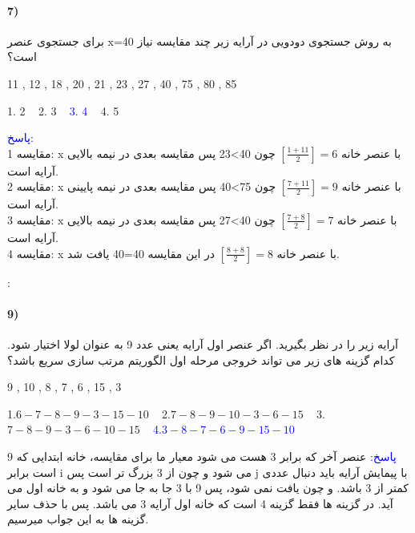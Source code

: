 \documentclass[10pt,a4paper]{article}
\begin{document}
	\paragraph{7)} برای جستجوی عنصر x=40 به روش جستجوی دودویی در آرایه زیر چند مقایسه نیاز است؟
	\begin{flushleft} 
		\begin{latin}
			11 , 12 , 18 , 20 , 21 , 23 , 27 , 40 , 75 , 80 , 85 
		\end{latin}
	\end{flushleft}
	\begin{flushright} 
		1. 2\,\,\,\,\, 2. 3\,\,\,\,\, \textcolor{blue}{3. 4}\,\,\,\,\, 4. 5
	\end{flushright}
	\begin{flushright} 
		\textcolor{blue}{پاسخ:}\\
		مقایسه 1: x با عنصر خانه $[\frac{1+11}{2}]=6$ چون 40>23 پس مقایسه بعدی در نیمه بالایی آرایه است. \\
		مقایسه 2: x با عنصر خانه $[\frac{7+11}{2}]=9$ چون 75>40 پس مقایسه بعدی در نیمه پایینی آرایه است. \\
		مقایسه 3: x با عنصر خانه $[\frac{7+8}{2}]=7$ چون 40>27 پس مقایسه بعدی در نیمه بالایی آرایه است. \\ 
		مقایسه 4: x با عنصر خانه $[\frac{8+8}{2}]=8$ در این مقایسه 40=40 یافت شد.
	\end{flushright}:

	\paragraph{9)} آرایه زیر را در نظر بگیرید. اگر عنصر اول آرایه یعنی عدد 9 به عنوان لولا اختیار شود. کدام گزینه های زیر می تواند خروجی مرحله اول الگوریتم مرتب سازی سریع باشد؟
	\begin{flushleft} 
		\begin{latin}
			9 , 10 , 8 , 7 , 6 , 15 , 3
		\end{latin}
	\end{flushleft}
	\begin{flushright} 
		1.$6-7-8-9-3-15-10$\,\,\,\,\, 2.$7-8-9-10-3-6-15$\,\,\,\,\, 3.$7-8-9-3-6-10-15$\,\,\,\,\, \textcolor{blue}{4.$3-8-7-6-9-15-10$}
	\end{flushright}
	\begin{flushright} 
		\textcolor{blue}{پاسخ:}
		عنصر آخر که برابر 3 هست می شود معیار ما برای مقایسه، خانه ابتدایی که 9 است برابر i  می شود و چون از 3 بزرگ تر است پس j با پیمایش آرایه باید دنبال عددی کمتر از 3 باشد. و چون یافت نمی شود، پس 9 با 3 جا به جا می شود و به خانه اول می آید. در گزینه ها فقط گزینه 4 است که خانه اول آرایه 3 می باشد. پس با حذف سایر گزینه ها به این جواب میرسیم.
	\end{flushright}
\end{document}
